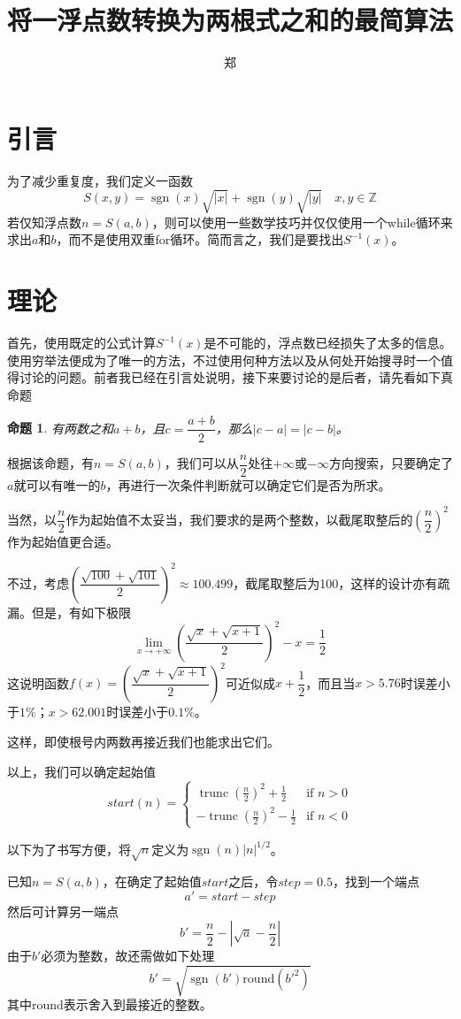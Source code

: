 \documentclass[a4paper, UTF8]{ctexart}
\title{将一浮点数转换为两根式之和的最简算法}
\author{郑}
\newtheorem{proposition}{命题}
\DeclareMathOperator{\sgn}{\mathrm{sgn}}
\DeclareMathOperator{\trunc}{\mathrm{trunc}}
\begin{document}
\maketitle

\section{引言}
为了减少重复度，我们定义一函数\[S(x,y)=\sgn(x)\sqrt{|x|}+\sgn(y)\sqrt{|y|} \quad x,y\in\mathbb{Z}\]若仅知浮点数$n=S(a,b)$，则可以使用一些数学技巧并仅仅使用一个while循环来求出$a$和$b$，而不是使用双重for循环。简而言之，我们是要找出$S^{-1}(x)$。

\section{理论}
首先，使用既定的公式计算$S^{-1}(x)$是不可能的，浮点数已经损失了太多的信息。使用穷举法便成为了唯一的方法，不过使用何种方法以及从何处开始搜寻时一个值得讨论的问题。前者我已经在引言处说明，接下来要讨论的是后者，请先看如下真命题
\begin{proposition}
    有两数之和$a+b$，且$c=\dfrac{a+b}{2}$，那么$|c-a|=|c-b|$。
\end{proposition}
根据该命题，有$n=S(a,b)$，我们可以从$\dfrac{n}{2}$处往$+\infty$或$-\infty$方向搜索，只要确定了$a$就可以有唯一的$b$，再进行一次条件判断就可以确定它们是否为所求。

当然，以$\dfrac{n}{2}$作为起始值不太妥当，我们要求的是两个整数，以截尾取整后的$\left(\dfrac{n}{2}\right)^2$作为起始值更合适。

不过，考虑$\left(\dfrac{\sqrt{100}+\sqrt{101}}{2}\right)^2\approx100.499$，截尾取整后为100，这样的设计亦有疏漏。但是，有如下极限\[\lim_{x\to+\infty} \left(\frac{\sqrt{x}+\sqrt{x+1}}{2}\right)^2-x=\frac{1}{2}\]这说明函数$f(x)=\left(\dfrac{\sqrt{x}+\sqrt{x+1}}{2}\right)^2$可近似成$x+\dfrac{1}{2}$，而且当$x>5.76$时误差小于$1\%$；$x>62.001$时误差小于$0.1\%$。

这样，即使根号内两数再接近我们也能求出它们。

以上，我们可以确定起始值
\[
    start(n)=
    \begin{cases}
        \trunc(\frac{n}{2})^2+\frac{1}{2} & \text{if }n>0 \\
        -\trunc(\frac{n}{2})^2-\frac{1}{2} & \text{if }n<0
    \end{cases}
\]

以下为了书写方便，将$\sqrt{n}$定义为$\sgn(n)|n|^{1/2}$。

已知$n=S(a,b)$，在确定了起始值$start$之后，令$step=0.5$，找到一个端点\[a'=start-step\]然后可计算另一端点\[b'=\frac{n}{2}-|\sqrt{a}-\frac{n}{2}|\]由于$b'$必须为整数，故还需做如下处理\[b'=\sqrt{\sgn(b')\mathrm{round}(b'^2)}\]其中round表示舍入到最接近的整数。
\end{document}
